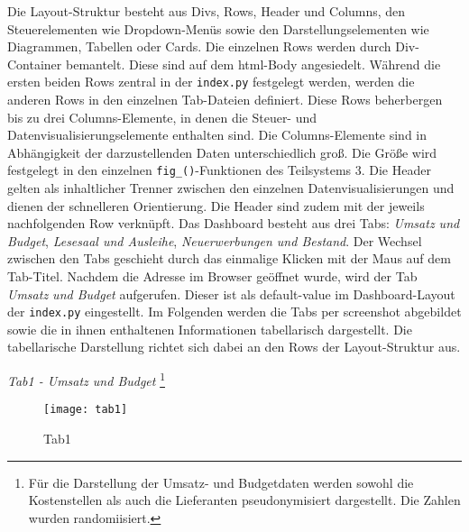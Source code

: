     Die Layout-Struktur besteht aus Divs, Rows, Header und Columns, den Steuerelementen wie Dropdown-Menüs sowie den Darstellungselementen wie Diagrammen, Tabellen
    oder Cards. Die einzelnen Rows werden durch Div-Container bemantelt. Diese sind auf dem html-Body angesiedelt.
    Während die ersten beiden Rows zentral in der \texttt{index.py} festgelegt werden, werden die anderen Rows in den einzelnen Tab-Dateien definiert. 
    Diese Rows beherbergen bis zu drei Columns-Elemente, in denen die Steuer- und Datenvisualisierungselemente enthalten sind.
    Die Columns-Elemente sind in Abhängigkeit der darzustellenden Daten unterschiedlich groß. 
    Die Größe wird festgelegt in den einzelnen \texttt{fig\_()}-Funktionen des Teilsystems 3.
    Die Header gelten als inhaltlicher Trenner zwischen den einzelnen Datenvisualisierungen und dienen der schnelleren Orientierung. 
    Die Header sind zudem mit der jeweils nachfolgenden Row verknüpft. Das Dashboard besteht aus drei Tabs: \textit{Umsatz und Budget}, 
    \textit{Lesesaal und Ausleihe}, \textit{Neuerwerbungen und Bestand}. Der Wechsel zwischen den Tabs geschieht durch das einmalige
    Klicken mit der Maus auf dem Tab-Titel. Nachdem die Adresse im Browser geöffnet wurde, wird der Tab \textit{Umsatz und Budget} aufgerufen. Dieser ist
    als default-value im Dashboard-Layout der \texttt{index.py} eingestellt. Im Folgenden werden die Tabs per screenshot abgebildet sowie 
    die in ihnen enthaltenen Informationen tabellarisch dargestellt. Die tabellarische Darstellung richtet sich dabei an den Rows der Layout-Struktur aus. 


    \recalctypearea
    
    \textit{Tab1 - Umsatz und Budget}
    \footnote{  Für die Darstellung der Umsatz- und
    Budgetdaten werden sowohl die Kostenstellen als auch die Lieferanten pseudonymisiert dargestellt. Die Zahlen
    wurden randomiisiert.}
    \begin{figure}[H]
        \centering
            \texttt{[image: tab1]}
            \caption{Tab1}
            \label{fig:tab1}
    \end{figure}

